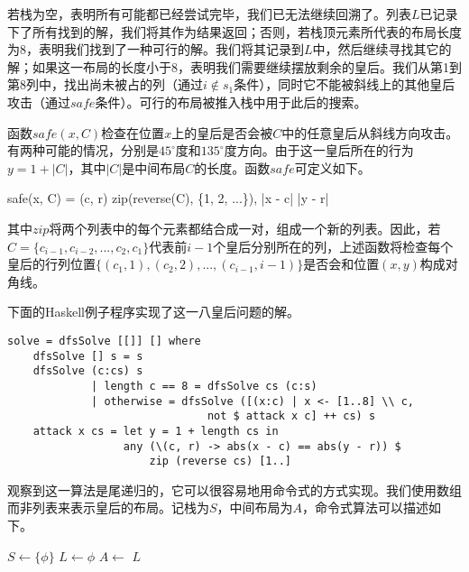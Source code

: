 \documentclass[UTF8]{article}
\begin{document}
若栈为空，表明所有可能都已经尝试完毕，我们已无法继续回溯了。列表$L$已记录下了所有找到的解，我们将其作为结果返回；否则，若栈顶元素所代表的布局长度为8，表明我们找到了一种可行的解。我们将其记录到$L$中，然后继续寻找其它的解；如果这一布局的长度小于8，表明我们需要继续摆放剩余的皇后。我们从第1到第8列中，找出尚未被占的列（通过$i \notin s_1$条件），同时它不能被斜线上的其他皇后攻击（通过$safe$条件）。可行的布局被推入栈中用于此后的搜索。

函数$safe(x, C)$检查在位置$x$上的皇后是否会被$C$中的任意皇后从斜线方向攻击。有两种可能的情况，分别是$45^{\circ}$度和$135^{\circ}$度方向。由于这一皇后所在的行为$y = 1 + |C|$，其中$|C|$是中间布局$C$的长度。函数$safe$可定义如下。

\be
safe(x, C) = \forall (c, r) \in zip(reverse(C), \{1, 2, ...\}), |x - c| \neq |y - r|
\ee

其中$zip$将两个列表中的每个元素都结合成一对，组成一个新的列表。因此，若$C = \{ c_{i-1}, c_{i-2}, ..., c_2, c_1\}$代表前$i-1$个皇后分别所在的列，上述函数将检查每个皇后的行列位置$\{(c_1, 1), (c_2, 2), ..., (c_{i-1}, i-1)\}$是否会和位置$(x, y)$构成对角线。

下面的Haskell例子程序实现了这一八皇后问题的解。

\lstset{language=Haskell}
\begin{lstlisting}
solve = dfsSolve [[]] [] where
    dfsSolve [] s = s
    dfsSolve (c:cs) s
             | length c == 8 = dfsSolve cs (c:s)
             | otherwise = dfsSolve ([(x:c) | x <- [1..8] \\ c,
                               not $ attack x c] ++ cs) s
    attack x cs = let y = 1 + length cs in
                  any (\(c, r) -> abs(x - c) == abs(y - r)) $
                      zip (reverse cs) [1..]
\end{lstlisting}

观察到这一算法是尾递归的，它可以很容易地用命令式的方式实现。我们使用数组而非列表来表示皇后的布局。记栈为$S$，中间布局为$A$，命令式算法可以描述如下。

\begin{algorithmic}[1]
  \State $S \gets \{\phi\}$
  \State $L \gets \phi$ 
    \State $A \gets$  
      \State {}
    \Else
          \State {}
        \EndIf
      \EndFor
    \EndIf
  \EndWhile
  \State \Return $L$
\EndFunction
\end{algorithmic}
\end{document}
